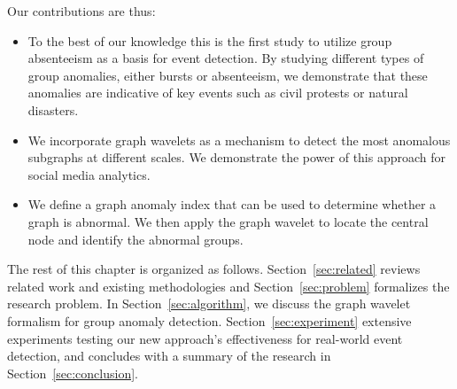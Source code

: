 
Our contributions are thus:
\begin{itemize}
\item To the best of our knowledge this is the first study to utilize group absenteeism as a basis for event detection. By studying different types of group anomalies, either bursts or absenteeism, we demonstrate that these anomalies are indicative of key
events such as civil protests or natural disasters.
\item We incorporate graph wavelets as a mechanism to detect the most anomalous subgraphs at different scales. We demonstrate the power of this approach for social media analytics.
\item We define a graph anomaly index that can be used to determine whether a graph is abnormal. We then apply the graph wavelet to locate the central node and identify the abnormal groups.
\end{itemize}

The rest of this chapter is organized as follows. Section~\ref{sec:related} reviews related work and existing methodologies and Section~\ref{sec:problem} formalizes the research problem. In Section~\ref{sec:algorithm}, we discuss the graph wavelet formalism for group anomaly detection.
Section~\ref{sec:experiment} extensive experiments testing our new approach's effectiveness for real-world event detection, and concludes with a summary of the research in Section~\ref{sec:conclusion}.



